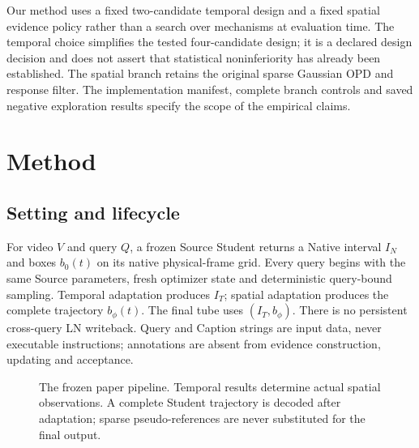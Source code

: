 \documentclass[11pt]{article}
\begin{document}
Our method uses a fixed two-candidate temporal design and a fixed spatial evidence policy rather than a search over mechanisms at evaluation time. The temporal choice simplifies the tested four-candidate design; it is a declared design decision and does not assert that statistical noninferiority has already been established. The spatial branch retains the original sparse Gaussian OPD and response filter. The implementation manifest, complete branch controls and saved negative exploration results specify the scope of the empirical claims.

\section{Method}
\subsection{Setting and lifecycle}
For video $V$ and query $Q$, a frozen Source Student returns a Native interval $I_N$ and boxes $b_0(t)$ on its native physical-frame grid. Every query begins with the same Source parameters, fresh optimizer state and deterministic query-bound sampling. Temporal adaptation produces $I_T$; spatial adaptation produces the complete trajectory $b_\phi(t)$. The final tube uses $(I_T,b_\phi)$. There is no persistent cross-query LN writeback. Query and Caption strings are input data, never executable instructions; annotations are absent from evidence construction, updating and acceptance.

\begin{figure}[h]
\centering
{}
\caption{The frozen paper pipeline. Temporal results determine actual spatial observations. A complete Student trajectory is decoded after adaptation; sparse pseudo-references are never substituted for the final output.}
\end{figure}
\end{document}
